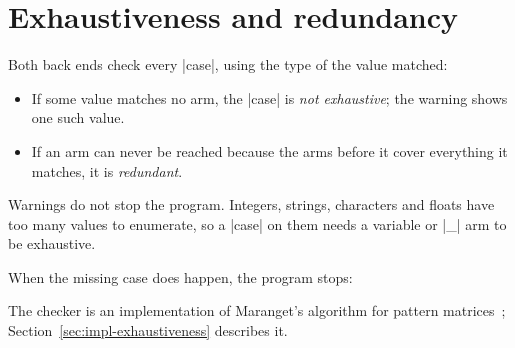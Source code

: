 \section{Exhaustiveness and redundancy}
\label{sec:exhaustiveness}

Both back ends check every \fc|case|, using the type of the value matched:
\begin{itemize}
  \item If some value matches no arm, the \fc|case| is \emph{not
    exhaustive}; the warning shows one such value.
  \item If an arm can never be reached because the arms before it cover
    everything it matches, it is \emph{redundant}.
\end{itemize}
Warnings do not stop the program. Integers, strings, characters and floats
have too many values to enumerate, so a \fc|case| on them needs a variable
or \fc|_| arm to be exhaustive.


When the missing case does happen, the program stops:


The checker is an implementation of Maranget's algorithm for pattern
matrices~\cite{maranget}; Section~\ref{sec:impl-exhaustiveness} describes it.
